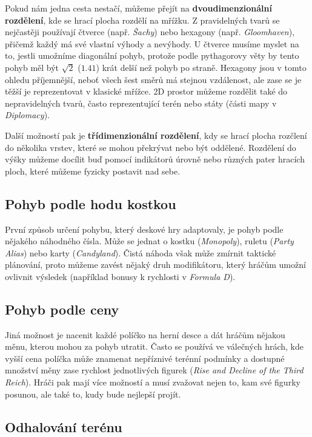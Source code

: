 Pokud nám jedna cesta nestačí, můžeme přejít na \textbf{dvoudimenzionální rozdělení}, kde se hrací plocha rozdělí na mřížku. Z pravidelných tvarů se nejčastěji používají čtverce (např. \textit{Šachy}) nebo hexagony (např. \textit{Gloomhaven}), přičemž každý má své vlastní výhody a nevýhody. U čtverce musíme myslet na to, jestli umožníme diagonální pohyb, protože podle pythagorovy věty by tento pohyb měl být $\sqrt{2}$ ($1.41$) krát delší než pohyb po straně. Hexagony jsou v tomto ohledu příjemnější, neboť všech šest směrů má stejnou vzdálenost, ale zase se je těžší je reprezentovat v klasické mřížce. 2D prostor můžeme rozdělit také do nepravidelných tvarů, často reprezentující terén nebo státy (části mapy v \textit{Diplomacy}).

Další možností pak je \textbf{třídimenzionální rozdělení}, kdy se hrací plocha rozčlení do několika vrstev, které se mohou překrývat nebo být oddělené. Rozdělení do výšky můžeme docílit buď pomocí indikátorů úrovně nebo různých pater hracích ploch, které můžeme fyzicky postavit nad sebe.

\subsection{Pohyb podle hodu kostkou}
\label{subsec:movement_roll_movement}

První způsob určení pohybu, který deskové hry adaptovaly, je pohyb podle nějakého náhodného čísla. Může se jednat o kostku (\textit{Monopoly}), ruletu (\textit{Party Alias}) nebo karty (\textit{Candyland}). Čistá náhoda však může zmírnit taktické plánování, proto můžeme zavést nějaký druh modifikátoru, který hráčům umožní ovlivnit výsledek (například bonusy k rychlosti v \textit{Formula D}).

\subsection{Pohyb podle ceny}
\label{subsec:movement_cost_movement}

Jiná možnost je nacenit každé políčko na herní desce a dát hráčům nějakou měnu, kterou mohou za pohyb utratit. Často se používá ve válečných hrách, kde vyšší cena políčka může znamenat nepříznivé terénní podmínky a dostupné množství měny zase rychlost jednotlivých figurek (\textit{Rise and Decline of the Third Reich}). Hráči pak mají více možností a musí zvažovat nejen to, kam své figurky posunou, ale také to, kudy bude nejlepší projít.

\subsection{Odhalování terénu}
\label{subsec:map_reveal}

